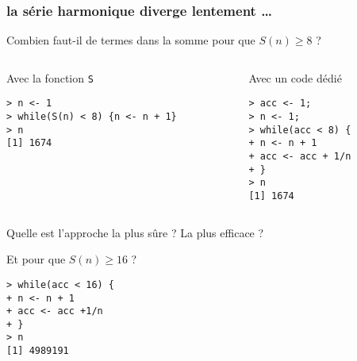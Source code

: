 \documentclass[10pt]{beamer}
\begin{document}
\begin{frame}[fragile]
  \frametitle{la série harmonique diverge lentement \dots}

  \begin{block}{Combien faut-il de termes dans la somme pour que $S(n) \geq 8$ ?}

\begin{columns}[t]
\begin{column}{0.55\textwidth}
  \begin{block}{Avec la fonction \texttt{S}}
    \begin{lstlisting}[style=block]
> n <- 1
> while(S(n) < 8) {n <- n + 1}
> n
[1] 1674
\end{lstlisting}
  \end{block}
\end{column}
\begin{column}{0.45\textwidth}
  \begin{block}{Avec un code dédié}
    \begin{lstlisting}[style=block]
> acc <- 1;
> n <- 1;
> while(acc < 8) {
+ n <- n + 1
+ acc <- acc + 1/n
+ }
> n
[1] 1674
\end{lstlisting}
\end{block}
\end{column}
\end{columns}
Quelle est l'approche la plus sûre ? La plus efficace ?
\end{block}

\begin{block}{Et pour que $S(n) \geq 16$ ?}

\begin{lstlisting}[style=block]
> while(acc < 16) {
+ n <- n + 1
+ acc <- acc +1/n
+ }
> n
[1] 4989191
\end{lstlisting}
\end{block}
\end{frame}



\end{document}
